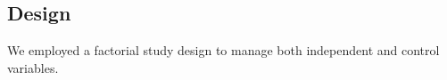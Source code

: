 



\subsection{Design}



We employed a factorial study design to manage both independent and control variables.


